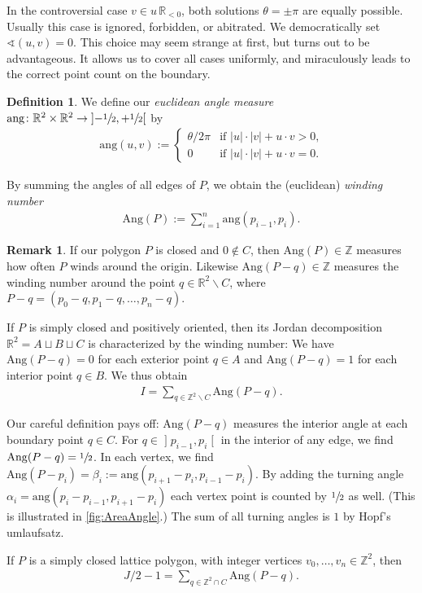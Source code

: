 \documentclass[a4paper]{amsart}
\numberwithin{equation}{section}
\theoremstyle{plain}
\theoremstyle{definition}
\newtheorem{definition}[theorem]{Definition}
\newtheorem{remark}[theorem]{Remark}
\newcommand{\Z}{\mathbb{Z}}
\newcommand{\R}{\mathbb{R}}
\newcommand{\ee}[2]{\mathopen] #1, #2 \mathclose[}
\newcommand{\minus}{\smallsetminus}
\newcommand{\abs}[1]{\lvert #1 \rvert}
\newcommand{\ang}{\mathrm{ang}}
\newcommand{\Ang}{\mathrm{Ang}}
\begin{document}
In the controversial case $v \in u \, \R_{<0}$,
both solutions $\theta = \pm\pi$ are equally possible.
Usually this case is ignored, forbidden, or abitrated.
We democratically set $\sphericalangle(u,v) = 0$. %
This choice may seem strange at first, but turns out to be advantageous.
It allows us to cover all cases uniformly,
and miraculously leads to the correct point count on the boundary.

\begin{definition}
  We define our \emph{euclidean angle measure}
  $\ang \colon \R^2 \times \R^2 \to \ee{-\sfrac{1}{2}}{+\sfrac{1}{2}}$ by
  \begin{align}
    \ang(u,v) := \begin{cases}
      \theta / 2\pi & \text{if $\abs{u} \cdot \abs{v} + u \cdot v > 0$,}
      \\ 0 & \text{if $\abs{u} \cdot \abs{v} + u \cdot v = 0$.}
    \end{cases}
  \end{align}
  
  By summing the angles of all edges of $P$,
  we obtain the (euclidean) \emph{winding number} %
  \begin{align}
    \Ang(P) := \sum_{i=1}^n \ang(p_{i-1},p_i) .
  \end{align}
\end{definition}

\begin{remark}
  If our polygon $P$ is closed and $0 \notin C$, then $\Ang(P) \in \Z$
  measures how often $P$ winds around the origin.
  Likewise $\Ang(P-q) \in \Z$ measures the winding number
  around the point $q \in \R^2 \minus C$,
  where $P-q = (p_0-q,p_1-q,\ldots,p_n-q)$.

  If $P$ is simply closed and positively oriented,
  then its Jordan decomposition $\R^2 = A \sqcup B \sqcup C$
  is characterized by the winding number:
  We have $\Ang(P-q) = 0$ for each exterior point $q \in A$
  and $\Ang(P-q) = 1$ for each interior point $q \in B$.
  We thus obtain
  \begin{align}
    I = \sum_{q \in \Z^2 \minus C} \Ang(P-q) .
  \end{align}
  
  Our careful definition pays off: %
  $\Ang(P-q)$ measures the interior angle at each boundary point $q \in C$.
  For $q \in \ee{p_{i-1}}{p_i}$ in the interior of any edge,
  we find $\Ang(P-q) = \sfrac{1}{2}$.  In each vertex, we find
  $\Ang(P-p_i) = \beta_i := \ang(p_{i+1}-p_i, p_{i-1}-p_i)$.
  By adding the turning angle $\alpha_i = \ang(p_i-p_{i-1}, p_{i+1}-p_i)$
  each vertex point is counted by $\sfrac{1}{2}$ as well.
  (This is illustrated in \autoref{fig:AreaAngle}.)
  The sum of all turning angles is $1$ by Hopf's umlaufsatz. %

  If $P$ is a simply closed lattice polygon,
  with integer vertices $v_0,\ldots,v_n \in \Z^2$, then
  \begin{align}
    J/2 - 1 = \sum_{q \in \Z^2 \cap C} \Ang(P-q) .
  \end{align}
\end{remark}
\end{document}
